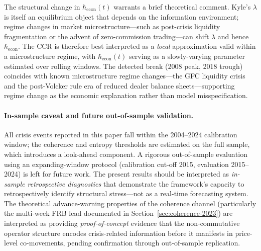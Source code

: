 The structural change in $\hbar_{\mathrm{econ}}(t)$ warrants a brief theoretical
comment. Kyle's $\lambda$ is itself an equilibrium object that depends on the
information environment; regime changes in market microstructure---such as
post-crisis liquidity fragmentation or the advent of zero-commission trading---can
shift $\lambda$ and hence $\hbar_{\mathrm{econ}}$. The CCR is therefore best
interpreted as a \emph{local} approximation valid within a microstructure regime,
with $\hbar_{\mathrm{econ}}(t)$ serving as a slowly-varying parameter estimated
over rolling windows. The detected break (2008 peak, 2018 trough) coincides with
known microstructure regime changes---the GFC liquidity crisis and the post-Volcker
rule era of reduced dealer balance sheets---supporting regime change as the
economic explanation rather than model misspecification.

\paragraph{In-sample caveat and future out-of-sample validation.}
All crisis events reported in this paper fall within the 2004--2024 calibration
window; the coherence and entropy thresholds are estimated on the full sample,
which introduces a look-ahead component. A rigorous out-of-sample evaluation
using an expanding-window protocol (calibration cut-off 2015, evaluation
2015--2024) is left for future work. The present results should be interpreted
as \emph{in-sample retrospective diagnostics} that demonstrate the framework's
capacity to retrospectively identify structural stress---not as a real-time
forecasting system. The theoretical advance-warning properties of the coherence
channel (particularly the multi-week FRB lead documented in
Section~\ref{sec:coherence-2023}) are interpreted as
providing \emph{proof-of-concept} evidence that the non-commutative operator
structure encodes crisis-related information before it manifests in price-level
co-movements, pending confirmation through out-of-sample replication.

